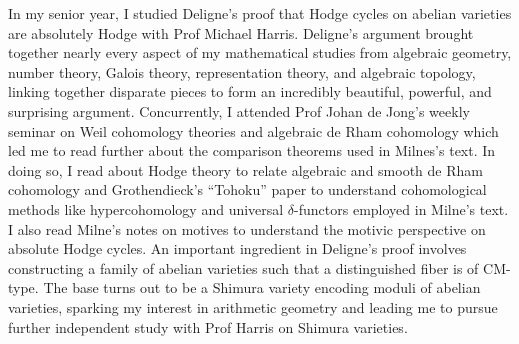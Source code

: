 \documentclass[11pt]{article}
\begin{document}
In my senior year, I studied Deligne's proof that Hodge cycles on abelian varieties are absolutely Hodge with Prof Michael Harris. Deligne's argument brought together nearly every aspect of my mathematical studies from algebraic geometry, number theory, Galois theory, representation theory, and algebraic topology, linking together disparate pieces to form an incredibly beautiful, powerful, and surprising argument. 
Concurrently, I attended Prof Johan de Jong's weekly seminar on Weil cohomology theories and algebraic de Rham cohomology which led me to read further about the comparison theorems used in Milnes's text. In doing so, I read about Hodge theory to relate algebraic and smooth de Rham cohomology and Grothendieck's ``Tohoku'' paper to understand cohomological methods like hypercohomology and universal $\delta$-functors employed in Milne's text. I also read Milne's notes on motives to understand the motivic perspective on absolute Hodge cycles. An important ingredient in Deligne's proof involves constructing a family of abelian varieties such that a distinguished fiber is of CM-type. The base turns out to be a Shimura variety encoding moduli of abelian varieties, sparking my interest in arithmetic geometry and leading me to pursue further independent study with Prof Harris on Shimura varieties.
\par
\end{document}

